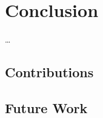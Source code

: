 \documentclass[../techreport.tex]{subfiles}
\begin{document}
\section{Conclusion}
\ldots
\subsection{Contributions}
\lipsum[21]
\subsection{Future Work}
\lipsum[22]
\end{document}

